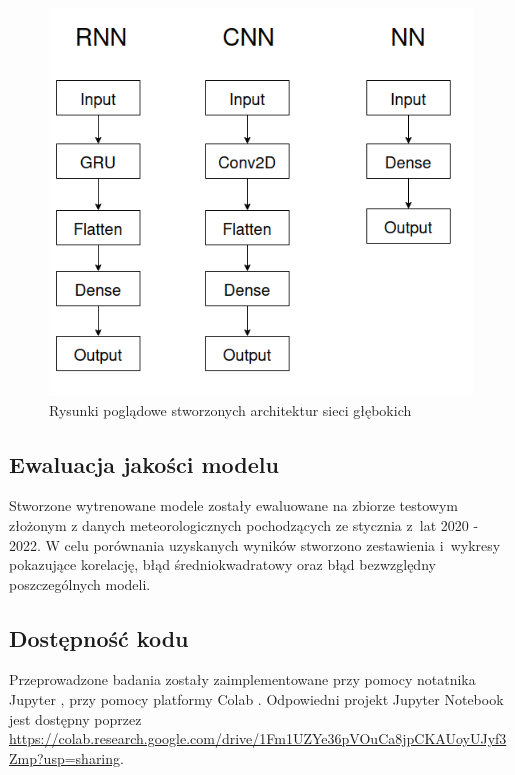 \begin{figure}[H]
    \centering
    \includegraphics[width=\textwidth]{images/architectures.png}
    \caption[Architektury sieci głębokich]{Rysunki poglądowe stworzonych architektur sieci
    głębokich}
    \label{arch}
\end{figure}

\subsection{Ewaluacja jakości modelu}

Stworzone wytrenowane modele zostały ewaluowane na zbiorze testowym złożonym
z danych meteorologicznych pochodzących ze stycznia z~lat 2020 - 2022.
W celu porównania uzyskanych wyników stworzono zestawienia i~wykresy pokazujące
korelację, błąd średniokwadratowy oraz błąd bezwzględny poszczególnych modeli.

\subsection{Dostępność kodu}

Przeprowadzone badania zostały zaimplementowane przy pomocy notatnika Jupyter
\cite{jupyter}, przy pomocy platformy Colab \cite{colab}. Odpowiedni projekt
Jupyter Notebook jest dostępny poprzez \url{https://colab.research.google.com/drive/1Fm1UZYe36pVOuCa8jpCKAUoyUJyf3Zmp?usp=sharing}.

\pagebreak